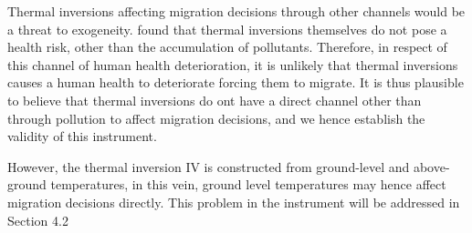 \documentclass[11pt,twocolumn]{article}
\begin{document}
Thermal inversions affecting migration decisions through other channels would be a threat to exogeneity. \citet{arceo2016} found that thermal inversions themselves do not pose a health risk, other than the accumulation of pollutants. Therefore, in respect of this channel of human health deterioration, it is unlikely that thermal inversions causes a human health to deteriorate forcing them to migrate. It is thus plausible to believe that thermal inversions do ont have a direct channel other than through pollution to affect migration decisions, and we hence establish the validity of this instrument. 

However, the thermal inversion IV is constructed from ground-level and above-ground temperatures, in this vein, ground level temperatures may hence affect migration decisions directly. This problem in the instrument will be addressed in Section 4.2



\end{document}

